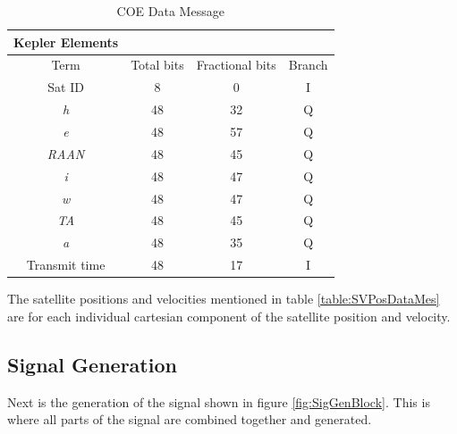 \documentclass[12pt]{report}
\begin{document}
\begin{table}
    \begin{center}
        \begin{tabular}{|c|c|c|c|}
            \hline
            Kepler Elements \\
            \hline\hline
            Term & Total bits & Fractional bits & Branch \\
            \hline
            Sat ID & 8 & 0 & I \\
            \hline
            \textit{h} & 48 & 32 & Q \\
            \hline
            \textit{e} & 48 & 57 & Q \\
            \hline
            \textit{RAAN} & 48 & 45 & Q \\
            \hline
            \textit{i} & 48 & 47 & Q \\
            \hline
            \textit{w} & 48 & 47 & Q \\
            \hline
            \textit{TA} & 48 & 45 & Q \\
            \hline
            \textit{a} & 48 & 35 & Q \\
            \hline
            Transmit time & 48 & 17 & I \\
            \hline
        \end{tabular}
    \end{center}
    \caption{COE Data Message}
    \label{table:COEdatMes}
\end{table}
The satellite positions and velocities mentioned in table \ref{table:SVPosDataMes} are for each individual cartesian component of the satellite position and velocity.

\subsection{Signal Generation}\label{sec:signalgen}
Next is the generation of the signal shown in figure \ref{fig:SigGenBlock}. This is where all parts of the signal are combined together and generated. 
\end{document}
